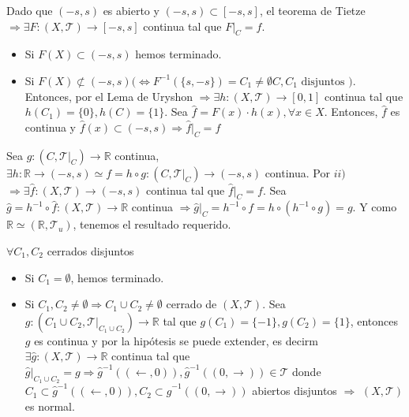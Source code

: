 \begin{dem}
   Dado que $(-s, s)$ es abierto y $(-s, s) \subset [-s, s]$, el teorema de Tietze $\Rightarrow \exists F: ( X, \mathcal{T} ) \to [-s, s]$ continua tal que $F|_{C} = f$. 
  \begin{itemize}
    \item Si $F(X) \subset (-s, s)$ hemos terminado.
    \item Si $F(X) \not \subset (-s, s) \big ( \Leftrightarrow F^{-1}(\{ s, -s \}) = C_{1} \neq \emptyset C, C_{1} \text{ disjuntos }\big )$. Entonces, por el Lema de Uryshon $\Rightarrow \exists h: ( X, \mathcal{T} ) \to [0,1]$ continua tal que $h(C_{1}) = \{ 0 \}, h(C) = \{ 1 \}$. Sea $\hat{f} = F(x) \cdot h(x), \forall x \in X$. Entonces, $\hat{f}$ es continua y $\hat{ f }(x) \subset ( -s, s) \Rightarrow \hat{ f }|_{C} = f$
  \end{itemize}

   Sea $g: ( C, \mathcal{T}|_{C}) \to \mathbb{R}$ continua, $\exists h: \mathbb{R} \to (-s, s) \simeq f = h \circ g : ( C, \mathcal{T}|_{C}) \to (-s, s)$ continua. Por $ii)$ $\Rightarrow \exists \hat{ f }: ( X, \mathcal{T} ) \to (-s, s)$ continua tal que $\hat{ f }|_{C}=f$. Sea $\hat{ g } = h^{-1} \circ \hat{ f }: ( X, \mathcal{T} ) \to \mathbb{R}$ continua $\Rightarrow \hat{ g }|_{C} = h^{-1} \circ f = h \circ (h^{-1} \circ g) = g$. Y como $\mathbb{R} \simeq ( \mathbb{R}, \mathcal{T}_{u} )$, tenemos el resultado requerido.

   $\forall C_{1}, C_{2}$ cerrados disjuntos
  \begin{itemize}
    \item Si $C_{1} = \emptyset$,  hemos terminado.
    \item Si $C_{1},C_{2} \neq \emptyset \Rightarrow C_{1} \cup C_{2} \neq \emptyset$ cerrado de $ ( X, \mathcal{T} )$. Sea $g: ( C_{1} \cup C_{2}, \mathcal{T}|_{C_{1} \cup C_{2}}) \to \mathbb{R}$ tal que $g(C_{1}) = \{ -1 \}, g(C_{2}) = \{ 1 \}$, entonces $g$ es continua y por la hipótesis se puede extender, es decirm $\exists \hat{ g }: ( X, \mathcal{T} ) \to \mathbb{R}$ continua tal que $\hat{ g }|_{C_{1} \cup C_{2}} = g \Rightarrow \hat{ g }^{-1}((\leftarrow, 0)), \hat{ g }^{-1}((0, \rightarrow)) \in \mathcal{T}$ donde $ C_{1} \subset \hat{ g }^{-1}((\leftarrow, 0)), C_{2} \subset \hat{ g }^{-1}((0, \rightarrow))$ abiertos disjuntos $\Rightarrow$ $( X, \mathcal{T} )$ es normal.
  \end{itemize}
\end{dem}
